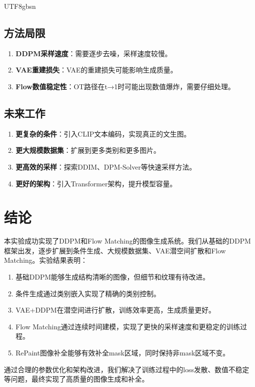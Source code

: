 \documentclass[11pt,a4paper]{article}
\begin{document}
\begin{CJK*}{UTF8}{gbsn}
\subsection{方法局限}

\begin{enumerate}
\item \textbf{DDPM采样速度}：需要逐步去噪，采样速度较慢。
\item \textbf{VAE重建损失}：VAE的重建损失可能影响生成质量。
\item \textbf{Flow数值稳定性}：OT路径在t→1时可能出现数值爆炸，需要仔细处理。
\end{enumerate}

\subsection{未来工作}

\begin{enumerate}
\item \textbf{更复杂的条件}：引入CLIP文本编码，实现真正的文生图。
\item \textbf{更大规模数据集}：扩展到更多类别和更多图片。
\item \textbf{更高效的采样}：探索DDIM、DPM-Solver等快速采样方法。
\item \textbf{更好的架构}：引入Transformer架构，提升模型容量。
\end{enumerate}

\section{结论}

本实验成功实现了DDPM和Flow Matching的图像生成系统。我们从基础的DDPM框架出发，逐步扩展到条件生成、大规模数据集、VAE潜空间扩散和Flow Matching。实验结果表明：

\begin{enumerate}
\item 基础DDPM能够生成结构清晰的图像，但细节和纹理有待改进。
\item 条件生成通过类别嵌入实现了精确的类别控制。
\item VAE+DDPM在潜空间进行扩散，训练效率更高，生成质量更好。
\item Flow Matching通过连续时间建模，实现了更快的采样速度和更稳定的训练过程。
\item RePaint图像补全能够有效补全mask区域，同时保持非mask区域不变。
\end{enumerate}

通过合理的参数优化和架构改进，我们解决了训练过程中的loss发散、数值不稳定等问题，最终实现了高质量的图像生成和补全。


\end{CJK*}
\end{document}
